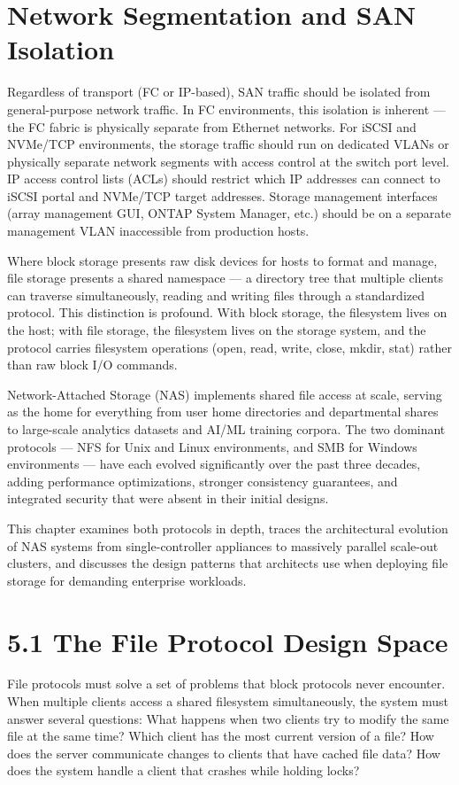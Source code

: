 \section{Network Segmentation and SAN Isolation}
Regardless of transport (FC or IP-based), SAN traffic should be isolated from general-purpose network traffic. In FC environments, this isolation is inherent --- the FC fabric is physically separate from Ethernet networks. For iSCSI and NVMe/TCP environments, the storage traffic should run on dedicated VLANs or physically separate network segments with access control at the switch port level. IP access control lists (ACLs) should restrict which IP addresses can connect to iSCSI portal and NVMe/TCP target addresses. Storage management interfaces (array management GUI, ONTAP System Manager, etc.) should be on a separate management VLAN inaccessible from production hosts.


Where block storage presents raw disk devices for hosts to format and manage, file storage presents a shared namespace --- a directory tree that multiple clients can traverse simultaneously, reading and writing files through a standardized protocol. This distinction is profound. With block storage, the filesystem lives on the host; with file storage, the filesystem lives on the storage system, and the protocol carries filesystem operations (open, read, write, close, mkdir, stat) rather than raw block I/O commands.

Network-Attached Storage (NAS) implements shared file access at scale, serving as the home for everything from user home directories and departmental shares to large-scale analytics datasets and AI/ML training corpora. The two dominant protocols --- NFS for Unix and Linux environments, and SMB for Windows environments --- have each evolved significantly over the past three decades, adding performance optimizations, stronger consistency guarantees, and integrated security that were absent in their initial designs.

This chapter examines both protocols in depth, traces the architectural evolution of NAS systems from single-controller appliances to massively parallel scale-out clusters, and discusses the design patterns that architects use when deploying file storage for demanding enterprise workloads.

\section{5.1 The File Protocol Design Space}
File protocols must solve a set of problems that block protocols never encounter. When multiple clients access a shared filesystem simultaneously, the system must answer several questions: What happens when two clients try to modify the same file at the same time? Which client has the most current version of a file? How does the server communicate changes to clients that have cached file data? How does the system handle a client that crashes while holding locks?

